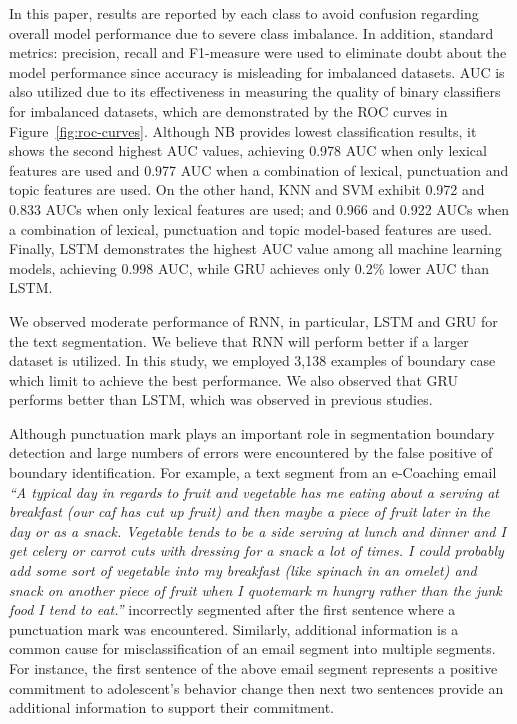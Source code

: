 \documentclass{amia}
\begin{document}
In this paper, results are reported by each class to avoid confusion regarding overall model performance due to severe class imbalance. In addition, standard metrics: precision, recall and F1-measure were used to eliminate doubt about the model performance since accuracy is misleading for imbalanced datasets. AUC is also utilized due to its effectiveness in measuring the quality of binary classifiers for imbalanced datasets\cite{hu2015kernelized}, which are demonstrated by the ROC curves in Figure~\ref{fig:roc-curves}. Although NB provides lowest classification results, it shows the second highest AUC values, achieving 0.978 AUC when only lexical features are used and 0.977 AUC when a combination of lexical, punctuation and topic features are used. On the other hand, KNN and SVM exhibit 0.972 and 0.833 AUCs when only lexical features are used; and 0.966 and 0.922 AUCs when a combination of lexical, punctuation and topic model-based features are used. Finally, LSTM demonstrates the highest AUC value among all machine learning models, achieving 0.998 AUC, while GRU achieves only 0.2\% lower AUC than LSTM. 


We observed moderate performance of RNN, in particular, LSTM and GRU for the text segmentation. We believe that RNN will perform better if a larger dataset is utilized. In this study, we employed 3,138 examples of boundary case which limit to achieve the best performance. We also observed that GRU performs better than LSTM, which was observed in previous studies\cite{chung2014empirical}.

Although punctuation mark plays an important role in segmentation boundary detection and large numbers of errors were encountered by the false positive of boundary identification. For example, a text segment from an e-Coaching email \textit{``A typical day in regards to fruit and vegetable has me eating about a serving at breakfast (our caf has cut up fruit) and then maybe a piece of fruit later in the day or as a snack. Vegetable tends to be a side serving at lunch and dinner and I get celery or carrot cuts with dressing for a snack a lot of times. I could probably add some sort of vegetable into my breakfast (like spinach in an omelet) and snack on another piece of fruit when I quotemark m hungry rather than the junk food I tend to eat.''} incorrectly segmented after the first sentence where a punctuation mark was encountered. Similarly, additional information is a common cause for misclassification of an email segment into multiple segments. For instance, the first sentence of the above email segment represents a positive commitment to adolescent's behavior change then next two sentences provide an additional information to support their commitment. 
\end{document}
